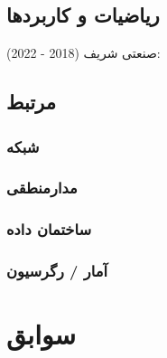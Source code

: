 \documentclass{article}
\begin{document}
\subsection{ریاضیات و کاربردها}
صنعتی شریف (2018 - 2022):
\subsection{مرتبط}
\subsubsection{شبکه}
\subsubsection{مدارمنطقی}
\subsubsection{ساختمان داده}
\subsubsection{آمار /  رگرسیون}
\section{سوابق}
\end{document}
